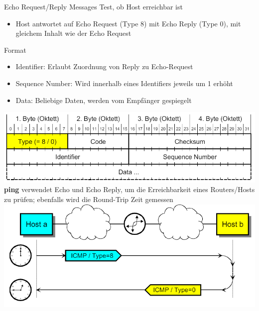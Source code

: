 \begin{definition}{Echo Request/Reply Messages}
    Test, ob Host erreichbar ist
    \begin{itemize}
        \item Host antwortet auf Echo Request (Type 8) mit Echo Reply (Type 0), mit gleichem Inhalt wie der Echo Request
    \end{itemize}
    Format
    \begin{itemize}
        \item Identifier: Erlaubt Zuordnung von Reply zu Echo-Request
        \item Sequence Number: Wird innerhalb eines Identifiers jeweils um 1 erhöht
        \item Data: Beliebige Daten, werden vom Empfänger gespiegelt
    \end{itemize}
        \includegraphics[width=0.75\linewidth]{images/icmp_echorequest.png}\\
    \textbf{ping} verwendet Echo und Echo Reply, um die Erreichbarkeit eines Routers/Hosts zu prüfen; ebenfalls wird die Round-Trip Zeit gemessen\\
        \includegraphics[width=0.75\linewidth]{images/ping.png}
\end{definition}





